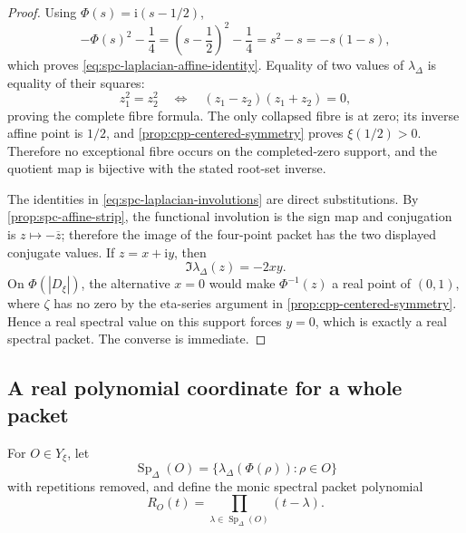 \begin{proof}
Using \(\Phi(s)=\mathrm i(s-1/2)\),
\[
 -\Phi(s)^2-\frac14
 =
 \left(s-\frac12\right)^2-\frac14
 =s^2-s=-s(1-s),
\]
which proves \eqref{eq:spc-laplacian-affine-identity}.  Equality of two
values of \(\lambda_\Delta\) is equality of their squares:
\[
 z_1^2=z_2^2
 \quad\Longleftrightarrow\quad
 (z_1-z_2)(z_1+z_2)=0,
\]
proving the complete fibre formula.  The only collapsed fibre is at zero;
its inverse affine point is \(1/2\), and
\cref{prop:cpp-centered-symmetry} proves \(\xi(1/2)>0\).  Therefore no
exceptional fibre occurs on the completed-zero support, and the quotient map
is bijective with the stated root-set inverse.

The identities in \eqref{eq:spc-laplacian-involutions} are direct
substitutions.  By \cref{prop:spc-affine-strip}, the functional involution is
the sign map and conjugation is \(z\mapsto-\overline z\); therefore the image
of the four-point packet has the two displayed conjugate values.  If
\(z=x+\mathrm iy\), then
\[
 \Im\lambda_\Delta(z)=-2xy.
\]
On \(\Phi(|D_\xi|)\), the alternative \(x=0\) would make
\(\Phi^{-1}(z)\) a real point of \((0,1)\), where \(\zeta\) has no zero by
the eta-series argument in \cref{prop:cpp-centered-symmetry}.  Hence a real
spectral value on this support forces \(y=0\), which is exactly a real
spectral packet.  The converse is immediate.
\end{proof}

\subsection{A real polynomial coordinate for a whole packet}

For \(O\in Y_\xi\), let
\[
 \operatorname{Sp}_\Delta(O)
 =
 \{\lambda_\Delta(\Phi(\rho)):\rho\in O\}
\]
with repetitions removed, and define the monic spectral packet polynomial
\begin{equation}
\label{eq:spc-spectral-polynomial-definition}
 R_O(t)=\prod_{\lambda\in\operatorname{Sp}_\Delta(O)}(t-\lambda).
\end{equation}


